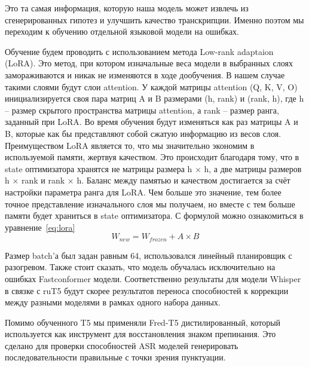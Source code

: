 Это та самая информация, которую наша модель может извлечь из сгенерированных гипотез и улучшить качество транскрипции.
Именно поэтом мы переходим к обучению отдельной языковой модели на ошибках.

Обучение будем проводить с использованием метода Low-rank adaptaion (LoRA).
Это метод, при котором изначальные веса модели в выбранных слоях замораживаются и никак не изменяются в ходе дообучения.
В нашем случае такими слоями будут слои attention.
У каждой матрицы attention (Q, K, V, O) инициализируется своя пара матриц A и B размерами (h, rank) и (rank, h), где h – размер скрытого пространства матрицы attention, а rank – размер ранга, заданный при LoRA.
Во время обучения будут изменяться как раз матрицы A и B, которые как бы представляют собой сжатую информацию из весов слоя.
Преимуществом LoRA является то, что мы значительно экономим в используемой памяти, жертвуя качеством.
Это происходит благодаря тому, что в state оптимизатора хранятся не матрицы размера h $\times$ h, а две матрицы размеров h $\times$ rank и rank $\times$ h.
Баланс между памятью и качеством достигается за счёт настройки параметра ранга для LoRA.
Чем больше это значение, тем более точное представление изначального слоя мы получаем, но вместе с тем больше памяти будет храниться в state оптимизатора.
С формулой можно ознакомиться в уравнение~\ref{eq:lora}
\begin{equation}
  W_{new} = W_{frozen} + A \times B
  \label{eq:lora}
\end{equation}

Размер batch'а был задан равным 64, использовался линейный планировщик с разогревом.
Также стоит сказать, что модель обучалась исключительно на ошибках Fastconformer модели.
Соответственно результаты для модели Whisper в связке с ruT5 будут скорее результатов переноса способностей к коррекции между разными моделями в рамках одного набора данных.

Помимо обученного T5 мы применяли Fred-T5 дистилированный, который используется как инструмент для восстановления знаком препинания.
Это сделано для проверки способностей ASR моделей генерировать последовательности правильные с точки зрения пунктуации.

